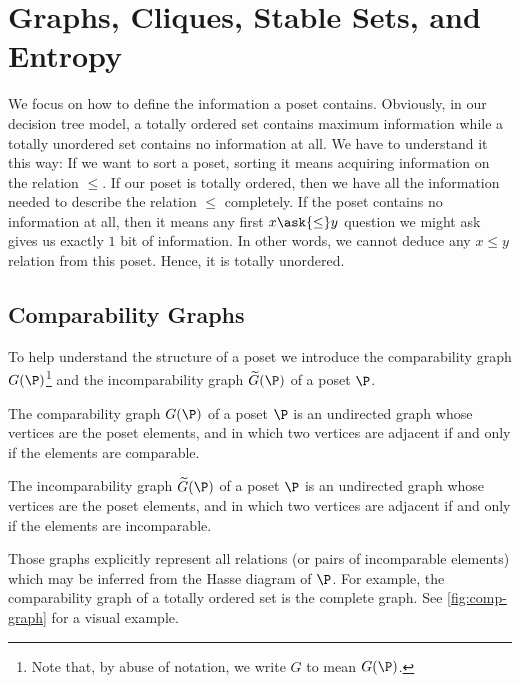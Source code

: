 \section{Graphs, Cliques, Stable Sets, and Entropy}
\label{tree:poset:graph}

We focus on how to define the information a poset contains. Obviously, in
our decision tree model, a totally ordered set contains maximum information
while a totally unordered set contains no information at all. We have to
understand it this way: If we want to sort a poset, sorting it means acquiring
information on the relation $\le$. If our poset is totally ordered, then we
have all the information needed to describe the relation $\le$ completely. If
the poset contains no information at all, then it means any first $x \ask{\le}
y$ question we might ask gives us exactly $1$ bit of information. In other
words, we cannot deduce any $x \le y$ relation from this poset. Hence, it is
totally unordered.

\subsection{Comparability Graphs}

To help understand the structure of a poset we introduce the comparability
graph ${G}(\P)$\footnote{
Note that, by abuse of notation, we write $G$ to mean ${G}(\P)$.
}
and the incomparability graph $\widetilde{G}(\P)$ of a poset
\(\P\).
\begin{definition}
The comparability graph ${G}(\P)$ of a poset $\P$ is an undirected graph whose
vertices are the poset elements, and in which two vertices are adjacent if and
only if the elements are comparable.
\end{definition}
\begin{definition}
The incomparability graph $\widetilde{G}(\P)$ of a poset $\P$ is an undirected
graph whose vertices are the poset elements, and in which two vertices are
adjacent if and only if the elements are incomparable.
\end{definition}

Those graphs explicitly represent all relations (or pairs of incomparable
elements) which may be inferred from the Hasse diagram of $\P$. For example,
the comparability graph of a totally ordered set is the complete graph. See
\ref{fig:comp-graph} for a visual example.



